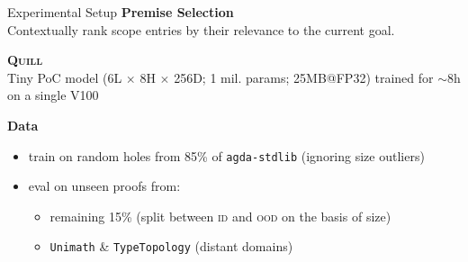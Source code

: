 \documentclass[aspectratio=169]{beamer}
\newcommand{\light}[1]{\textcolor{light}{#1}}
\newcommand\agdaQuill{\textsc{Quill}}
\begin{document}
\begin{frame}{Experimental Setup}
	\smaller
	\textbf{Premise Selection}\\
	Contextually rank scope entries by their relevance to the current goal.\vfill
	
		\textbf{\agdaQuill} \\
	Tiny PoC model (\light{6L $\times$ 8H $\times$ 256D; 1 mil. params; 25MB@FP32}) trained for $\sim$8h on a single V100\vfill
	
	\textbf{Data}
	\begin{itemize}
		\item train on random holes from 85\% of \texttt{agda-stdlib} (ignoring size outliers)
		\item eval on unseen proofs from:\vspace{-0.15em}
		\begin{itemize}
			\item remaining 15\% (split between \textsc{id} and \textsc{ood} on the basis of size)
			\item \texttt{Unimath} \& \texttt{TypeTopology} (distant domains)
		\end{itemize}
	\end{itemize}
\end{frame}
\end{document}
